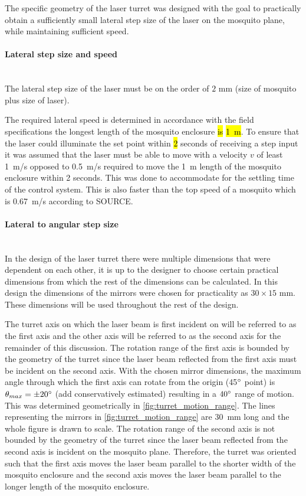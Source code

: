 The specific geometry of the laser turret was designed with the goal to practically obtain a sufficiently small lateral step size of the laser on the mosquito plane, while maintaining sufficient speed.

\paragraph{Lateral step size and speed}\mbox{}\\
\newcommand{\requiredLatStepSizeMM}{2} %
The lateral step size of the laser must be on the order of $\requiredLatStepSizeMM$ mm (size of mosquito plus size of laser).

\newcommand{\requiredLatSpeedMPS}{1} %
The required lateral speed is determined in accordance with the field specifications the longest length of the mosquito enclosure \hl{is} \hl{1~m}. To ensure that the laser could illuminate the set point within \hl{2} seconds of receiving a step input it was assumed that the laser must be able to move with a velocity $v$ of least \requiredLatSpeedMPS~m/s opposed to 0.5~m/s required to move the 1~m length of the mosquito enclosure within 2 seconds. This was done to accommodate for the settling time of the control system. This is also faster than the top speed of a mosquito which is 0.67~m/s according to SOURCE.

\paragraph{Lateral to angular step size}\mbox{}\\
\label{par:lateral_to_angular_step_size}
In the design of the laser turret there were multiple dimensions that were dependent on each other, it is up to the designer to choose certain practical dimensions from which the rest of the dimensions can be calculated. In this design the dimensions of the mirrors were chosen for practicality as $30 \times 15$ mm. These dimensions will be used throughout the rest of the design.

The turret axis on which the laser beam is first incident on will be referred to as the first axis and the other axis will be referred to as the second axis for the remainder of this discussion. The rotation range of the first axis is bounded by the geometry of the turret since the laser beam reflected from the first axis must be incident on the second axis. With the chosen mirror dimensions, the maximum angle through which the first axis can rotate from the origin (45$^{\circ}$ point) is $\theta_{max} =\pm 20^{\circ}$ (add conservatively estimated) resulting in a $40^{\circ}$ range of motion. This was determined geometrically in \autoref{fig:turret_motion_range}. The lines representing the mirrors in \autoref{fig:turret_motion_range} are 30~mm long and the whole figure is drawn to scale. The rotation range of the second axis is not bounded by the geometry of the turret since the laser beam reflected from the second axis is incident on the mosquito plane. Therefore, the turret was oriented such that the first axis moves the laser beam parallel to the shorter width of the mosquito enclosure and the second axis moves the laser beam parallel to the longer length of the mosquito enclosure.

